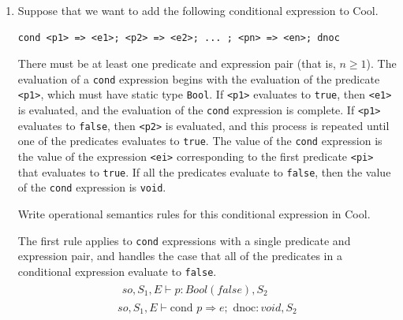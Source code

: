 \documentclass[11pt]{article}
\begin{document}

\begin{enumerate}

\item
\label{cond}
Suppose that we want to add the following conditional expression to
Cool.
\vspace{-0.5\baselineskip}
\begin{verbatim}
cond <p1> => <e1>; <p2> => <e2>; ... ; <pn> => <en>; dnoc
\end{verbatim}

\vspace{-0.5\baselineskip}
There must be at least one predicate and expression pair (that is,
$n \geq 1$).  The evaluation of a \texttt{cond} expression begins with
the evaluation of the predicate \texttt{<p1>}, which must have static
type \texttt{Bool}.  If \texttt{<p1>} evaluates to \texttt{true}, then
\texttt{<e1>} is evaluated, and the evaluation of the \texttt{cond}
expression is complete.  If \texttt{<p1>} evaluates to \texttt{false},
then \texttt{<p2>} is evaluated, and this process is repeated until
one of the predicates evaluates to \texttt{true}.  The value of the
\texttt{cond} expression is the value of the expression \texttt{<ei>}
corresponding to the first predicate \texttt{<pi>} that evaluates to
\texttt{true}.  If all the predicates evaluate to \texttt{false}, then
the value of the \texttt{cond} expression is \texttt{void}.

Write operational semantics rules for this conditional expression in
Cool.

The first rule applies to \texttt{cond} expressions with a single
predicate and expression pair, and handles the case that all of the
predicates in a conditional expression evaluate to \texttt{false}.
\begin{equation}
\begin{array}{c}
\begin{array}{l}
so, S_{1}, E \vdash p : Bool(false), S_{2}
\end{array} \\
\hline
so, S_{1}, E \vdash \text{cond } p \Rightarrow e ; \text{ dnoc}: void,
S_{2}
\end{array}
\tag*{[Cond-Single-False]}
\end{equation}


\end{enumerate}
\end{document}
